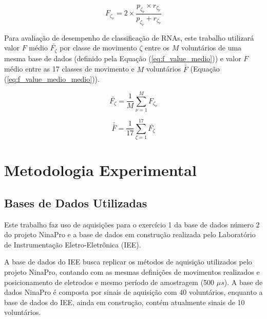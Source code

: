 \begin{equation}
\label{eq:fscore}
	F_{\zeta_{\nu}} = 2 \times \frac{p_{\zeta_{\nu}} \times r_{\zeta_{\nu}}}{p_{\zeta_{\nu}} + r_{\zeta_{\nu}}}
\end{equation}

Para avaliação de desempenho de classificação de RNAs, este trabalho utilizará valor $F$ médio $\bar{F_\zeta}$ por classe de movimento $\zeta$ entre os $M$ voluntários de uma mesma base de dados (definido pela Equação (\ref{eq:f_value_medio})) e valor $F$ médio entre as 17 classes de movimento e $M$ voluntários $\bar{\bar{F}}$ (Equação (\ref{eq:f_value_medio_medio})).

\begin{equation}
\label{eq:f_value_medio}
	\bar{F_\zeta} = \frac{1}{M}\sum\limits_{\nu = 1}^{M} F_{\zeta_{\nu}}
\end{equation}

\begin{equation}
\label{eq:f_value_medio_medio}
	\bar{\bar{F}} = \frac{1}{17}\sum\limits_{\zeta = 1}^{17} \bar{F_\zeta}
\end{equation}


	\chapter{Metodologia Experimental}

		\section{Bases de Dados Utilizadas}
Este trabalho faz uso de aquisições para o exercício 1 da base de dados número 2 do projeto NinaPro \cite{Gijsberts2014} e a base de dados em construção realizada pelo Laboratório de Instrumentação Eletro-Eletrônica (IEE).

A base de dados do IEE busca replicar os métodos de aquisição utilizados pelo projeto NinaPro, contando com as mesmas definições de movimentos realizados e posicionamento de eletrodos e mesmo período de amostragem (500 $\mu s$). A base de dados NinaPro é composta por sinais de aquisição com 40 voluntários, enquanto a base de dados do IEE, ainda em construção, contém atualmente sinais de 10 voluntários.


